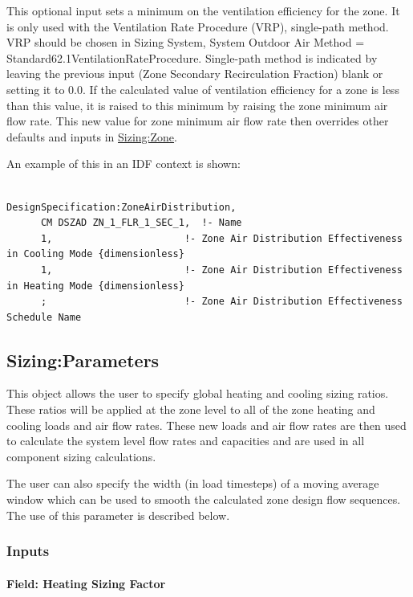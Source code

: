 This optional input sets a minimum on the ventilation efficiency for the zone. It is only used with the Ventilation Rate Procedure (VRP), single-path method. VRP should be chosen in Sizing System, System Outdoor Air Method = Standard62.1VentilationRateProcedure. Single-path method is indicated by leaving the previous input (Zone Secondary Recirculation Fraction) blank or setting it to 0.0. If the calculated value of ventilation efficiency for a zone is less than this value, it is raised to this minimum by raising the zone minimum air flow rate. This new value for zone minimum air flow rate then overrides other defaults and inputs in \hyperref[sizingzone]{Sizing:Zone}.

An example of this in an IDF context is shown:

\begin{lstlisting}

DesignSpecification:ZoneAirDistribution,
      CM DSZAD ZN_1_FLR_1_SEC_1,  !- Name
      1,                       !- Zone Air Distribution Effectiveness in Cooling Mode {dimensionless}
      1,                       !- Zone Air Distribution Effectiveness in Heating Mode {dimensionless}
      ;                        !- Zone Air Distribution Effectiveness Schedule Name
\end{lstlisting}

\subsection{Sizing:Parameters}\label{sizingparameters}

This object allows the user to specify global heating and cooling sizing ratios. These ratios will be applied at the zone level to all of the zone heating and cooling loads and air flow rates. These new loads and air flow rates are then used to calculate the system level flow rates and capacities and are used in all component sizing calculations.

The user can also specify the width (in load timesteps) of a moving average window which can be used to smooth the calculated zone design flow sequences. The use of this parameter is described below.

\subsubsection{Inputs}\label{inputs-2-010}

\paragraph{Field: Heating Sizing Factor}\label{field-heating-sizing-factor}

